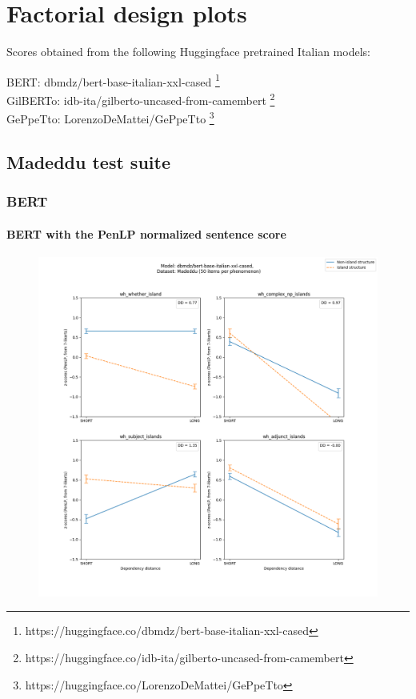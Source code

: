 \chapter{Factorial design plots}

Scores obtained from the following Huggingface pretrained Italian models:

BERT: dbmdz/bert-base-italian-xxl-cased \footnote{https://huggingface.co/dbmdz/bert-base-italian-xxl-cased} \\
GilBERTo: idb-ita/gilberto-uncased-from-camembert \footnote{https://huggingface.co/idb-ita/gilberto-uncased-from-camembert} \\
GePpeTto: LorenzoDeMattei/GePpeTto \citep{de2020geppetto} \footnote{https://huggingface.co/LorenzoDeMattei/GePpeTto} \\

\clearpage
\section{Madeddu test suite}

\subsection{BERT}
\subsubsection{BERT with the PenLP normalized sentence score}
\begin{figure}[h]
	\centering
	\includegraphics[width=1\textwidth]{images/AppendixA/Madeddu_wh_dbmdz_bert-base-italian-xxl-cased_PenLP-zscores-likert-2022-09-14_h15m34s07.png} 
	\label{A-fig:md_bert_penlp}
	\caption{}
\end{figure}


